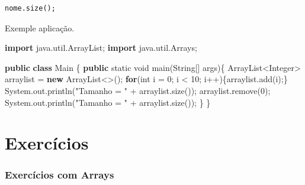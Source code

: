 \documentclass[
]{book}
\newenvironment{Shaded}{\begin{snugshade}}{\end{snugshade}}
\newcommand{\BuiltInTok}[1]{#1}
\newcommand{\DataTypeTok}[1]{\textcolor[rgb]{0.13,0.29,0.53}{#1}}
\newcommand{\DecValTok}[1]{\textcolor[rgb]{0.00,0.00,0.81}{#1}}
\newcommand{\FunctionTok}[1]{\textcolor[rgb]{0.00,0.00,0.00}{#1}}
\newcommand{\ImportTok}[1]{#1}
\newcommand{\KeywordTok}[1]{\textcolor[rgb]{0.13,0.29,0.53}{\textbf{#1}}}
\newcommand{\NormalTok}[1]{#1}
\newcommand{\StringTok}[1]{\textcolor[rgb]{0.31,0.60,0.02}{#1}}
\begin{document}
\begin{verbatim}
nome.size();
\end{verbatim}

Exemple aplicação.

\begin{Shaded}
\begin{Highlighting}[]
\KeywordTok{import}\ImportTok{ java.util.ArrayList;}
\KeywordTok{import}\ImportTok{ java.util.Arrays;}

\KeywordTok{public} \KeywordTok{class}\NormalTok{ Main \{}
    \KeywordTok{public} \DataTypeTok{static} \DataTypeTok{void} \FunctionTok{main}\NormalTok{(}\BuiltInTok{String}\NormalTok{[] args)\{}
        \BuiltInTok{ArrayList}\NormalTok{<}\BuiltInTok{Integer}\NormalTok{> arraylist = }\KeywordTok{new} \BuiltInTok{ArrayList}\NormalTok{<>();}
        \KeywordTok{for}\NormalTok{(}\DataTypeTok{int}\NormalTok{ i = }\DecValTok{0}\NormalTok{; i < }\DecValTok{10}\NormalTok{; i++)\{arraylist.}\FunctionTok{add}\NormalTok{(i);\}}
        \BuiltInTok{System}\NormalTok{.}\FunctionTok{out}\NormalTok{.}\FunctionTok{println}\NormalTok{(}\StringTok{"Tamanho = "}\NormalTok{ + arraylist.}\FunctionTok{size}\NormalTok{());}
\NormalTok{        arraylist.}\FunctionTok{remove}\NormalTok{(}\DecValTok{0}\NormalTok{);}
        \BuiltInTok{System}\NormalTok{.}\FunctionTok{out}\NormalTok{.}\FunctionTok{println}\NormalTok{(}\StringTok{"Tamanho = "}\NormalTok{ + arraylist.}\FunctionTok{size}\NormalTok{());}
\NormalTok{    \}}
\NormalTok{\}}
\end{Highlighting}
\end{Shaded}

\hypertarget{exercuxedcios-1}{%
\section*{Exercícios}\label{exercuxedcios-1}}

\hypertarget{exercuxedcios-com-arrays}{%
\subsubsection*{Exercícios com Arrays}\label{exercuxedcios-com-arrays}}
\end{document}
